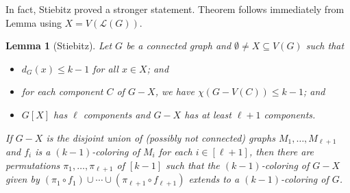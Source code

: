 \documentclass[12pt]{article}
\theoremstyle{plain}
\newtheorem*{Lemma}{Lemma}
\theoremstyle{definition}
\theoremstyle{remark}
\newcommand{\fancy}[1]{\mathcal{#1}}
\renewcommand{\L}{\fancy{L}}
\newcommand{\irange}[1]{\left[#1\right]}
\def\L{\fancy{L}}
\begin{document}
In fact, Stiebitz proved a stronger statement.  Theorem follows immediately from Lemma using $X = V(\L(G))$.
\begin{Lemma}[Stiebitz]
Let $G$ be a connected graph and $\emptyset \ne X \subseteq V(G)$ such that
\begin{itemize}
\item $d_G(x) \le k - 1$ for all $x \in X$; and
\item for each component $C$ of $G-X$, we have $\chi(G - V(C)) \le k - 1$; and
\item $G[X]$ has $\ell$ components and $G-X$ has at least $\ell + 1$ components.
\end{itemize}
If $G-X$ is the disjoint union of (possibly not connected) graphs $M_1, \ldots, M_{\ell + 1}$ and $f_i$ is a $(k-1)$-coloring of $M_i$ for each $i \in \irange{\ell + 1}$, 
then there are permutations $\pi_1, \ldots, \pi_{\ell + 1}$ of $\irange{k-1}$ such that the $(k-1)$-coloring of $G-X$ given by $(\pi_1 \circ f_1) \cup \cdots \cup (\pi_{\ell + 1} \circ f_{\ell + 1})$ extends to a $(k - 1)$-coloring of $G$.
\end{Lemma}
\end{document}
